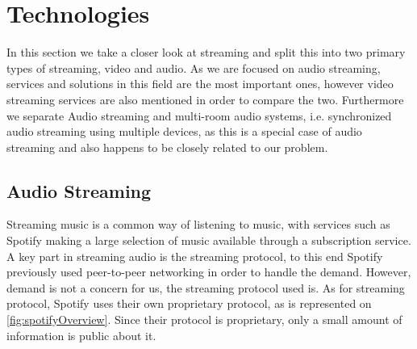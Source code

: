 






\section{Technologies}\label{sec:sota_technologies}
In this section we take a closer look at streaming and split this into two primary types of streaming, video and audio.
As we are focused on audio streaming, services and solutions in this field are the most important ones, however video streaming services are also mentioned in order to compare the two.
Furthermore we separate Audio streaming and multi-room audio systems, i.e. synchronized audio streaming using multiple devices, as this is a special case of audio streaming and also happens to be closely related to our problem.

\subsection{Audio Streaming}
Streaming music is a common way of listening to music, with services such as Spotify making a large selection of music available through a subscription service.
A key part in streaming audio is the streaming protocol, to this end Spotify previously used peer-to-peer networking in order to handle the demand.\cite{spotify1}
However, demand is not a concern for us, the streaming protocol used is.
As for streaming protocol, Spotify uses their own proprietary protocol, as is represented on \cref{fig:spotifyOverview}.\cite{spotifySlides} %
Since their protocol is proprietary, only a small amount of information is public about it.


